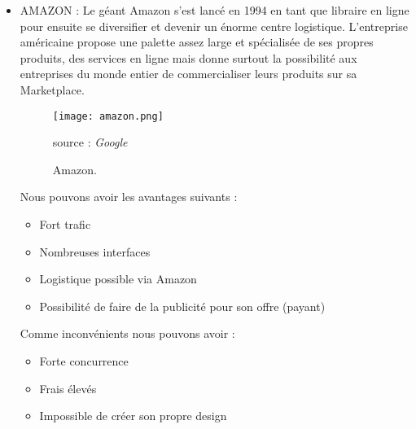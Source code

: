 \begin{itemize}[label=\textbullet, font=\LARGE \color{blue}] 
	\item AMAZON : Le géant Amazon s’est lancé en 1994 en tant que libraire en ligne pour ensuite se diversifier et devenir un énorme centre logistique. L’entreprise américaine propose une palette assez large et spécialisée de ses propres produits, des services en ligne mais donne surtout la possibilité aux entreprises du monde entier de commercialiser leurs produits sur sa Marketplace. 
		\begin{figure}[H]
			\centering
			\texttt{[image: amazon.png]}
			\caption{Amazon.}{ \begin{center} source : \textit{Google} \end{center}}
			\label{fig:amazon}
		\end{figure}
	Nous pouvons avoir les avantages suivants :
	\begin{itemize}[label=\textbullet, font=\LARGE \color{black}] 
		\item Fort trafic
		\item Nombreuses interfaces	
		\item Logistique possible via Amazon
		\item Possibilité de faire de la publicité pour son offre (payant)
	\end{itemize}
	Comme inconvénients nous pouvons avoir  :
	\begin{itemize}[label=\textbullet, font=\LARGE \color{black}] 
		\item Forte concurrence
		\item Frais élevés 	
		\item Impossible de créer son propre design
	\end{itemize}
	

\end{itemize}
